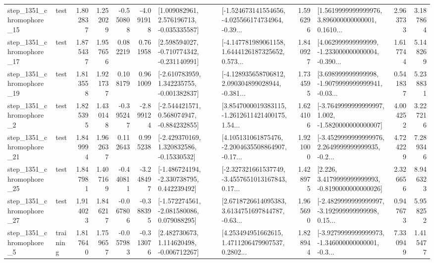 \begin{tabular}{llrrrrllrlrr}
 step\_1351\_chromophore\_15 &      test &      1.802837 &    1.252029 &     -0.550808 & -4.091918 &    [1.009082961, 2.576196713, -0.035335587] &  [-1.524673141554656, -4.025566174734964, -0.39... &       1.596296 &  [1.5619999999999976, 3.896000000000001, 0.1610... &            2.963733 &          3.187864 \\
 step\_1351\_chromophore\_17 &      test &      1.875437 &    1.957656 &      0.082219 &  0.761958 &   [2.598594027, -0.710774342, -0.231140991] &  [-4.147781989061158, 1.6444126187325652, 0.573... &       1.840927 &  [4.062999999999999, -1.233000000000004, -0.390... &            1.617744 &          5.148269 \\
 step\_1351\_chromophore\_19 &      test &      1.813558 &    1.921737 &      0.108179 &  0.961009 &   [-2.610783959, 1.342235755, -0.001382837] &  [-4.128935658706812, 2.090304899028944, -0.381... &       1.734595 &  [3.698999999999998, -1.9079999999999941, -0.03... &            0.541837 &          5.238831 \\
  step\_1351\_chromophore\_2 &      test &      1.825395 &    1.430148 &     -0.395247 & -2.899124 &   [-2.544421571, 0.568074947, -0.884232855] &  [3.8547000019383115, -1.2612611421400175, 1.54... &       1.624106 &  [-3.7649999999999997, 1.002, -1.5820000000000007] &            4.004252 &          3.227216 \\
 step\_1351\_chromophore\_21 &      test &      1.849994 &    1.962637 &      0.112643 &  0.995238 &    [-2.429370169, 1.320832586, -0.15330532] &  [4.105131061875476, -2.2004635508864907, -0.17... &       1.921000 &  [-3.4529999999999976, 2.2649999999999935, -0.2... &            4.724229 &          7.289346 \\
 step\_1351\_chromophore\_25 &      test &      1.847981 &    1.407169 &     -0.440811 & -3.248497 &   [-1.486724194, -2.330738795, 0.442239492] &  [-2.327321661537749, -3.4557651013167843, 0.17... &       1.428975 &   [2.226, 3.4179999999999993, -0.8190000000000026] &            2.326656 &          8.946323 \\
 step\_1351\_chromophore\_27 &      test &      1.914023 &    1.846217 &     -0.067806 & -0.388395 &   [-1.572274561, -2.081580086, 0.079088295] &  [2.6718726614095383, 3.6134751697844787, -0.63... &       1.965690 &  [-2.4829999999999997, -3.192999999999998, 0.15... &            0.947673 &          5.958252 \\
  step\_1351\_chromophore\_5 &  training &      1.817640 &    1.759657 &     -0.057983 & -0.313076 &    [2.482730673, 1.114620498, -0.006712267] &  [4.253494951662615, 1.4711206479907537, 0.2802... &       1.828944 &  [-3.9279999999999973, -1.346000000000001, -0.3... &            7.330949 &          1.415477 \\

\end{tabular}
